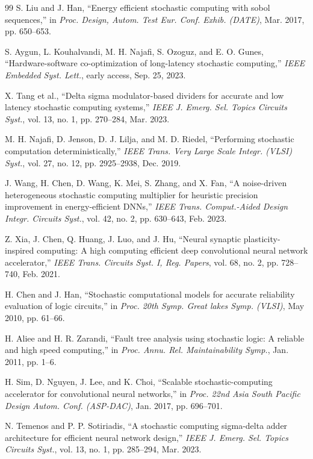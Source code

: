 \documentclass{solitairemiya-art}
\begin{document}
\begin{thebibliography}{99}
 S. Liu and J. Han, ``Energy efficient stochastic computing with sobol sequences,'' in \textit{Proc. Design, Autom. Test Eur. Conf. Exhib. (DATE)}, Mar. 2017, pp. 650--653.

 S. Aygun, L. Kouhalvandi, M. H. Najafi, S. Ozoguz, and E. O. Gunes, ``Hardware-software co-optimization of long-latency stochastic computing,'' \textit{IEEE Embedded Syst. Lett.}, early access, Sep. 25, 2023.

 X. Tang et al., ``Delta sigma modulator-based dividers for accurate and low latency stochastic computing systems,'' \textit{IEEE J. Emerg. Sel. Topics Circuits Syst.}, vol. 13, no. 1, pp. 270--284, Mar. 2023.

 M. H. Najafi, D. Jenson, D. J. Lilja, and M. D. Riedel, ``Performing stochastic computation deterministically,'' \textit{IEEE Trans. Very Large Scale Integr. (VLSI) Syst.}, vol. 27, no. 12, pp. 2925--2938, Dec. 2019.

 J. Wang, H. Chen, D. Wang, K. Mei, S. Zhang, and X. Fan, ``A noise-driven heterogeneous stochastic computing multiplier for heuristic precision improvement in energy-efficient DNNs,'' \textit{IEEE Trans. Comput.-Aided Design Integr. Circuits Syst.}, vol. 42, no. 2, pp. 630--643, Feb. 2023.

 Z. Xia, J. Chen, Q. Huang, J. Luo, and J. Hu, ``Neural synaptic plasticity-inspired computing: A high computing efficient deep convolutional neural network accelerator,'' \textit{IEEE Trans. Circuits Syst. I, Reg. Papers}, vol. 68, no. 2, pp. 728--740, Feb. 2021.

 H. Chen and J. Han, ``Stochastic computational models for accurate reliability evaluation of logic circuits,'' in \textit{Proc. 20th Symp. Great lakes Symp. (VLSI)}, May 2010, pp. 61--66.

 H. Aliee and H. R. Zarandi, ``Fault tree analysis using stochastic logic: A reliable and high speed computing,'' in \textit{Proc. Annu. Rel. Maintainability Symp.}, Jan. 2011, pp. 1--6.

 H. Sim, D. Nguyen, J. Lee, and K. Choi, ``Scalable stochastic-computing accelerator for convolutional neural networks,'' in \textit{Proc. 22nd Asia South Pacific Design Autom. Conf. (ASP-DAC)}, Jan. 2017, pp. 696--701.

 N. Temenos and P. P. Sotiriadis, ``A stochastic computing sigma-delta adder architecture for efficient neural network design,'' \textit{IEEE J. Emerg. Sel. Topics Circuits Syst.}, vol. 13, no. 1, pp. 285--294, Mar. 2023.


\end{thebibliography}
\end{document}
